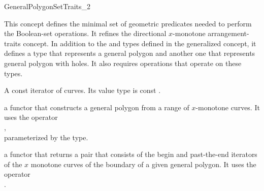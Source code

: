 \ccRefPageBegin

\begin{ccRefConcept}{GeneralPolygonSetTraits_2}

\ccThreeToTwo

\ccDefinition
This concept defines the minimal set of geometric predicates needed to
perform the Boolean-set operations. It refines the directional $x$-monotone
arrangement-traits concept. In addition to the  and
 types defined in the generalized concept, it defines
a type that represents a general polygon and another one that represents
general polygon with holes. It also requires operations that operate on these
types.

\ccRefines

\ccTypes

\ccGlue
{}

{A const iterator of curves. Its value type is const
.}


\ccThreeToTwo

{a functor that constructs a general polygon from a range of
$x$-monotone curves. It uses the operator\\
 , \\
 parameterized by the  type.}

{a functor that returns a pair that consists of the begin and
 past-the-end iterators of the $x$ monotone curves of the boundary of
 a given general polygon. It uses the operator\\
 .}


\end{ccRefConcept}
